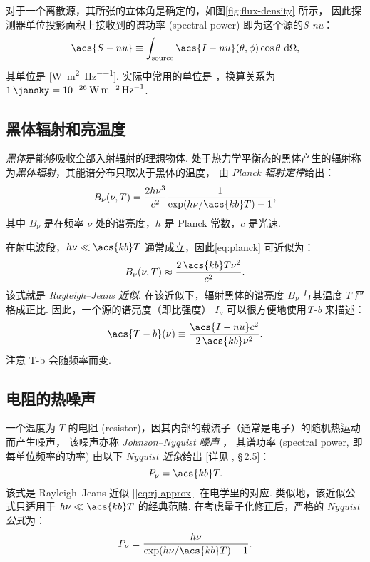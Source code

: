 对于一个离散源，其所张的立体角是确定的，如图\autoref{fig:flux-density} 所示，
因此探测器单位投影面积上接收到的谱功率 (spectral power)
即为这个源的\emph{\acf{S-nu}}：
\begin{equation}
  \label{eq:flux-density}
  \acs{S-nu} \equiv
    \int_{\R{source}} \acs{I-nu}(\theta,\phi) \cos\theta \,\D{\Omega} ,
\end{equation}
其单位是 [\si{\watt\per\square\meter\per\hertz}].
实际中常用的单位是 \si{\jansky}，换算关系为
$\SI{1}{\jansky} = \SI{e-26}{\watt\per\square\meter\per\hertz}$.

\subsection{黑体辐射和亮温度}

\emph{黑体}是能够吸收全部入射辐射的理想物体.
处于热力学平衡态的黑体产生的辐射称为\emph{黑体辐射}，其能谱分布只取决于黑体的温度，
由 \emph{Planck 辐射定律}给出：
\begin{equation}
  \label{eq:planck}
  B_{\nu}(\nu, T) = \frac{2 h \nu^3}{c^2}
    \frac{1}{\exp(h \nu / \acs{kb} T) - 1} ,
\end{equation}
其中 $B_{\nu}$ 是在频率 $\nu$ 处的谱亮度，$h$ 是 Planck 常数，$c$ 是光速.

在射电波段，$h\nu \ll \acs{kb}T$ 通常成立，因此\autoref{eq:planck}
可近似为：
\begin{equation}
  \label{eq:rj-approx}
  B_{\nu}(\nu, T) \approx \frac{2\,\acs{kb}T \nu^2}{c^2} .
\end{equation}
该式就是 \emph{Rayleigh--Jeans 近似}.
在该近似下，辐射黑体的谱亮度 $B_{\nu}$ 与其温度 $T$ 严格成正比.
因此，一个源的谱亮度（即比强度） $I_{\nu}$
可以很方便地使用\emph{\acf{T-b}} 来描述：
\begin{equation}
  \label{eq:Tb}
  \acs{T-b}(\nu) \equiv \frac{\acs{I-nu} c^2}{2 \,\acs{kb} \nu^2} .
\end{equation}
注意 \acs{T-b} 会随频率而变.

\subsection{电阻的热噪声}

一个温度为 $T$ 的电阻 (resistor)，因其内部的载流子（通常是电子）的随机热运动而产生噪声，
该噪声亦称 \emph{Johnson--Nyquist 噪声} \cite{johnson1928,nyquist1928}，
其谱功率 (spectral power, 即每单位频率的功率) 由以下 \emph{Nyquist 近似}给出
[详见 , \S\,2.5]：
\begin{equation}
  \label{eq:nyquist-approx}
  P_{\nu} = \acs{kb} T .
\end{equation}
该式是 Rayleigh--Jeans 近似 [\autoref{eq:rj-approx}] 在电学里的对应.
类似地，该近似公式只适用于 $h\nu \ll \acs{kb}T$ 的经典范畴.
在考虑量子化修正后，严格的 \emph{Nyquist 公式}为：
\begin{equation}
  \label{eq:nyquist}
  P_{\nu} = \frac{h\nu}{\exp(h \nu / \acs{kb} T) - 1} .
\end{equation}


